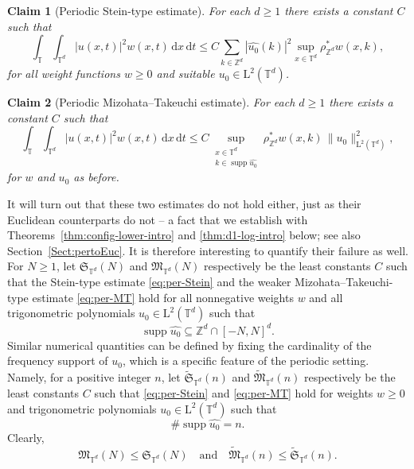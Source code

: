 \documentclass[10pt,a4paper]{amsart}
\newtheorem*{claim}{Claim}
\numberwithin{equation}{section}
\newcommand{\supp}{\operatorname{supp}}
\newcommand{\dd}{\,\mathrm{d}}
\renewcommand{\leq}{\leqslant}
\renewcommand{\geq}{\geqslant}
\renewcommand{\ge}{\geqslant}
\begin{document}
\begin{claim}[Periodic Stein-type estimate]%
For each $d\geq 1$ there exists a constant $C$ such that
\begin{equation}\label{eq:per-Stein}
\int_{\mathbb{T}} \int_{\mathbb{T}^d} \left|u(x,t)\right|^2w(x,t)\dd x\dd t\leq C\sum_{k\in\mathbb{Z}^d}|\widehat{u_0}(k)|^2\sup_{x\in\mathbb{T}^d}\rho^{\ast}_{\mathbb{Z}^{d}}w(x,k),
\end{equation}
for all weight functions $w\geq0$ and suitable $u_0\in \mathrm{L}^2(\mathbb{T}^d)$. 
\end{claim}

\begin{claim}[Periodic Mizohata--Takeuchi estimate]%
For each $d\geq 1$ there exists a constant $C$ such that
\begin{equation}\label{eq:per-MT}
\int_{\mathbb{T}} \int_{\mathbb{T}^d} \left|u(x,t)\right|^2w(x,t)\dd x\dd t\leq C \sup_{\substack{x\in\mathbb{T}^d\\ k\in\supp\widehat{u_0}}}\rho^{\ast}_{\mathbb{Z}^{d}}w(x,k) \,\|u_0\|_{\mathrm{L}^2(\mathbb{T}^d)}^2,
\end{equation}
for $w$ and $u_0$ as before. 
\end{claim}

It will turn out that these two estimates do not hold either, just as their Euclidean counterparts do not -- a fact that we establish with Theorems~\ref{thm:config-lower-intro} and \ref{thm:d1-log-intro} below; see also Section~\ref{Sect:pertoEuc}. It is therefore interesting to quantify their failure as well.
For $N\ge1$, let $\mathfrak{S}_{\mathbb{T}^d}(N)$ and $\mathfrak{M}_{\mathbb{T}^d}(N)$ respectively be the least constants $C$ such that the Stein-type estimate \eqref{eq:per-Stein} and the weaker Mizohata--Takeuchi-type estimate \eqref{eq:per-MT} hold for all nonnegative weights $w$ and all trigonometric polynomials $u_0\in\mathrm{L}^2(\mathbb{T}^d)$ such that
\[ \supp\widehat{u_0} \subseteq \mathbb{Z}^d \cap [-N,N]^d. \]
Similar numerical quantities can be defined by fixing the cardinality of the frequency support of $u_0$, which is a specific feature of the periodic setting. Namely, for a positive integer $n$, let $\widetilde{\mathfrak{S}}_{\mathbb{T}^d}(n)$ and $\widetilde{\mathfrak{M}}_{\mathbb{T}^d}(n)$ respectively be the least constants $C$ such that \eqref{eq:per-Stein} and \eqref{eq:per-MT} hold for weights $w\geq0$ and trigonometric polynomials $u_0\in\mathrm{L}^2(\mathbb{T}^d)$ such that
\[ \#\supp\widehat{u_0} = n. \]
Clearly,
\begin{equation}\label{eq:per-MT_vs_St}
\mathfrak{M}_{\mathbb{T}^d}(N) \leq \mathfrak{S}_{\mathbb{T}^d}(N) \quad\text{and}\quad \widetilde{\mathfrak{M}}_{\mathbb{T}^d}(n) \leq \widetilde{\mathfrak{S}}_{\mathbb{T}^d}(n).
\end{equation}
\end{document}
